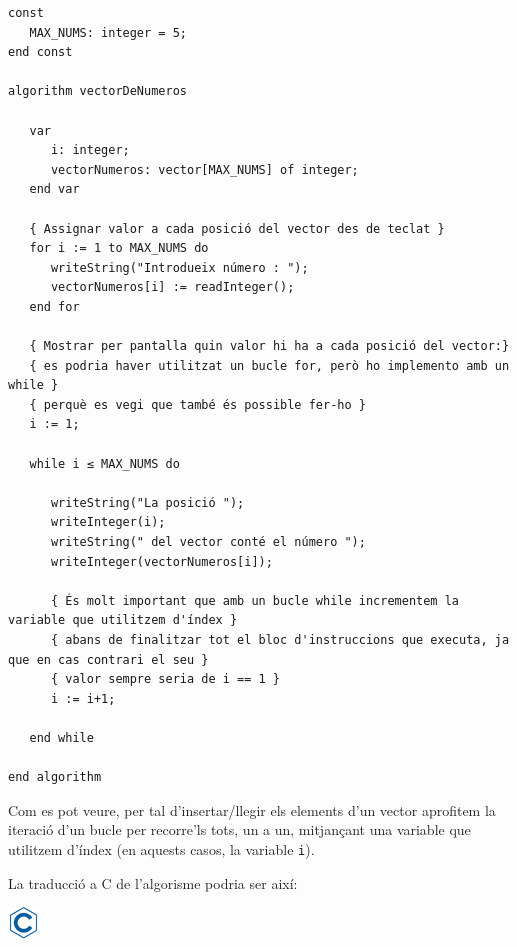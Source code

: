 \documentclass[]{book}
\begin{document}
\begin{verbatim}
const
   MAX_NUMS: integer = 5;
end const

algorithm vectorDeNumeros

   var
      i: integer;
      vectorNumeros: vector[MAX_NUMS] of integer;
   end var

   { Assignar valor a cada posició del vector des de teclat }
   for i := 1 to MAX_NUMS do
      writeString("Introdueix número : ");
      vectorNumeros[i] := readInteger();
   end for

   { Mostrar per pantalla quin valor hi ha a cada posició del vector:}
   { es podria haver utilitzat un bucle for, però ho implemento amb un while }
   { perquè es vegi que també és possible fer-ho }
   i := 1;

   while i ≤ MAX_NUMS do

      writeString("La posició ");
      writeInteger(i);
      writeString(" del vector conté el número ");
      writeInteger(vectorNumeros[i]);

      { És molt important que amb un bucle while incrementem la variable que utilitzem d'índex }
      { abans de finalitzar tot el bloc d'instruccions que executa, ja que en cas contrari el seu }
      { valor sempre seria de i == 1 }
      i := i+1;

   end while

end algorithm
\end{verbatim}

Com es pot veure, per tal d'insertar/llegir els elements d'un vector
aprofitem la iteració d'un bucle per recorre'ls tots, un a un,
mitjançant una variable que utilitzem d'índex (en aquests casos, la
variable \texttt{i}).

La traducció a C de l'algorisme podria ser així:

\includegraphics{./img/c.png}
\end{document}
